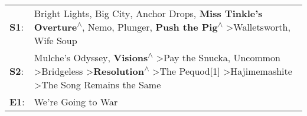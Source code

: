 \begin{supertabular}{p{0.03\textwidth}p{0.92\textwidth}}
 \textbf{S1}:  &                                                                                                          Bright Lights, Big City\textsuperscript{}, \enspace Anchor Drops\textsuperscript{}, \enspace \textbf{Miss Tinkle's Overture\textsuperscript{$\wedge$}}, \enspace Nemo\textsuperscript{}, \enspace Plunger\textsuperscript{}, \enspace \textbf{Push the Pig\textsuperscript{$\wedge$}} \textgreater \enspace Walletsworth\textsuperscript{}, \enspace Wife Soup\textsuperscript{}  \enspace  \\
 \textbf{S2}:  &  Mulche's Odyssey\textsuperscript{}, \enspace \textbf{Visions\textsuperscript{$\wedge$}} \textgreater \enspace Pay the Snucka\textsuperscript{}, \enspace Uncommon\textsuperscript{} \textgreater \enspace Bridgeless\textsuperscript{} \textgreater \enspace \textbf{Resolution\textsuperscript{$\wedge$}} \textgreater \enspace The Pequod[1]\textsuperscript{} \textgreater \enspace Hajimemashite\textsuperscript{} \textgreater \enspace The Song Remains the Same\textsuperscript{}  \enspace  \\
 \textbf{E1}:  &                                                                                                                                                                                                                                                                                                                                                                                                                                                      We're Going to War\textsuperscript{}  \enspace  \\
\end{supertabular}
